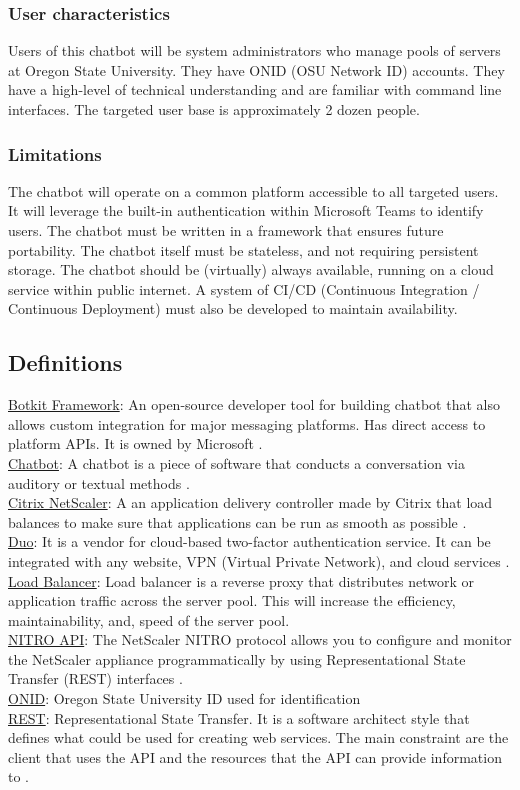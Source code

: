 \documentclass[onecolumn, draftclsnofoot,10pt, compsoc]{IEEEtran}
\begin{document}
\subsubsection{User characteristics}
Users of this chatbot will be system administrators who manage pools of servers at Oregon State University. They have ONID (OSU Network ID) accounts. They have a high-level of technical understanding and are familiar with command line interfaces. The targeted user base is approximately 2 dozen people.
\subsubsection{Limitations}
The chatbot will operate on a common platform accessible to all targeted users.
It will leverage the built-in authentication within Microsoft Teams to identify users.
The chatbot must be written in a framework that ensures future portability.
The chatbot itself must be stateless, and not requiring persistent storage.
The chatbot should be (virtually) always available, running on a cloud service within public internet.
A system of CI/CD (Continuous Integration / Continuous Deployment) must also be developed to maintain availability.

\subsection{Definitions}
\underline{Botkit Framework}: An open-source developer tool for building chatbot that also allows custom integration for major messaging platforms. Has direct access to platform APIs. It is owned by Microsoft \cite{framework}.
\\\underline{Chatbot}: A chatbot is a piece of software that conducts a conversation via auditory or textual methods \cite{chatbot}.
\\\underline{Citrix NetScaler}: A an application delivery controller made by Citrix that load balances to make sure that applications can be run as smooth as possible \cite{netscaler}.
\\\underline{Duo}: It is a vendor for cloud-based two-factor authentication service. It can be integrated with any website, VPN (Virtual Private Network), and cloud services \cite{duo}.
\\\underline{Load Balancer}: Load balancer is a reverse proxy that distributes network or application traffic across the server pool. This will increase the efficiency, maintainability, and, speed of the server pool. 
\\\underline{NITRO API}: The NetScaler NITRO protocol allows you to configure and monitor the NetScaler appliance programmatically by using Representational State Transfer (REST) interfaces \cite{citrixnitro}.
\\\underline{ONID}: Oregon State University ID used for identification
\\\underline{REST}: Representational State Transfer. It is a software architect style that defines what could be used for creating web services. The main constraint are the client that uses the API and the resources that the API can provide information to \cite{restphd} \cite{rest}.
\end{document}
